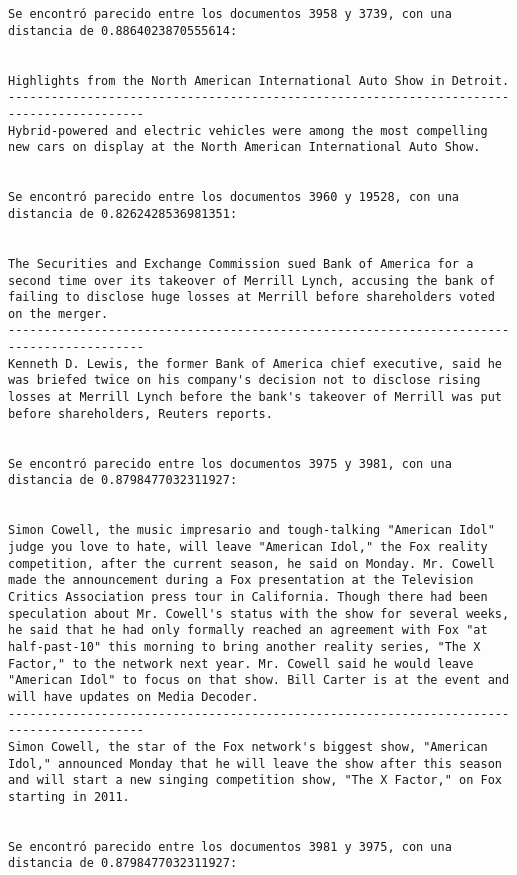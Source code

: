\documentclass[11pt]{article}
\begin{document}
\begin{Verbatim}[commandchars=\\\{\}]
Se encontró parecido entre los documentos 3958 y 3739, con una distancia de 0.8864023870555614:


Highlights from the North American International Auto Show in Detroit.
-----------------------------------------------------------------------------------------
Hybrid-powered and electric vehicles were among the most compelling new cars on display at the North American International Auto Show.


Se encontró parecido entre los documentos 3960 y 19528, con una distancia de 0.8262428536981351:


The Securities and Exchange Commission sued Bank of America for a second time over its takeover of Merrill Lynch, accusing the bank of failing to disclose huge losses at Merrill before shareholders voted on the merger.
-----------------------------------------------------------------------------------------
Kenneth D. Lewis, the former Bank of America chief executive, said he was briefed twice on his company's decision not to disclose rising losses at Merrill Lynch before the bank's takeover of Merrill was put before shareholders, Reuters reports.


Se encontró parecido entre los documentos 3975 y 3981, con una distancia de 0.8798477032311927:


Simon Cowell, the music impresario and tough-talking "American Idol" judge you love to hate, will leave "American Idol," the Fox reality competition, after the current season, he said on Monday. Mr. Cowell made the announcement during a Fox presentation at the Television Critics Association press tour in California. Though there had been speculation about Mr. Cowell's status with the show for several weeks, he said that he had only formally reached an agreement with Fox "at half-past-10" this morning to bring another reality series, "The X Factor," to the network next year. Mr. Cowell said he would leave "American Idol" to focus on that show. Bill Carter is at the event and will have updates on Media Decoder.
-----------------------------------------------------------------------------------------
Simon Cowell, the star of the Fox network's biggest show, "American Idol," announced Monday that he will leave the show after this season and will start a new singing competition show, "The X Factor," on Fox starting in 2011.


Se encontró parecido entre los documentos 3981 y 3975, con una distancia de 0.8798477032311927:



\end{Verbatim}
\end{document}

